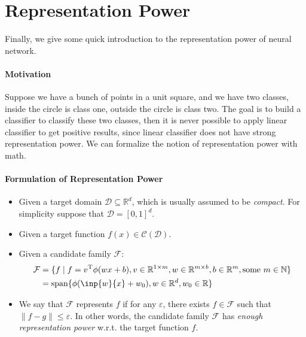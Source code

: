 \section{Representation Power}
Finally, we give some quick introduction to the representation power of neural network.

\paragraph{Motivation}
Suppose we have a bunch of points in a unit square, and we have two classes, inside the circle is class one, outside the circle is class two.
The goal is to build a classifier to classify these two classes, then it is never possible to apply linear classifier to get positive results, since linear classifier does not have strong representation power.
We can formalize the notion of representation power with math.
\paragraph{Formulation of Representation Power}
\begin{itemize}
\item
Given a target domain $\mathcal{D}\subseteq\mathbb{R}^d$, which is usually assumed to be \emph{compact}.
For simplicity suppose that $\mathcal{D}=[0,1]^d$.
\item
Given a target function $f(x)\in\mathcal{C}(\mathcal{D})$.
\item
Given a candidate family $\mathcal{F}$:
\begin{align*}
\mathcal{F}&=\{
f\mid 
f=v\trans\phi(wx+b),
v\in\mathbb{R}^{1\times m},
w\in\mathbb{R}^{m\times b},b\in\mathbb{R}^m,
\text{some }m\in\mathbb{N}
\}\\
&=\text{span}\{
\phi(\inp{w}{x}+w_0), w\in\mathbb{R}^{d},w_0\in\mathbb{R}
\}
\end{align*}
\item
We say that $\mathcal{F}$ represents $f$ if for any $\varepsilon$, there exists $f\in\mathcal{F}$ such that $\|f-g\|\le\varepsilon$. In other words, the candidate family $\mathcal{F}$ has \emph{enough representation power} w.r.t. the target function $f$.
\end{itemize}

